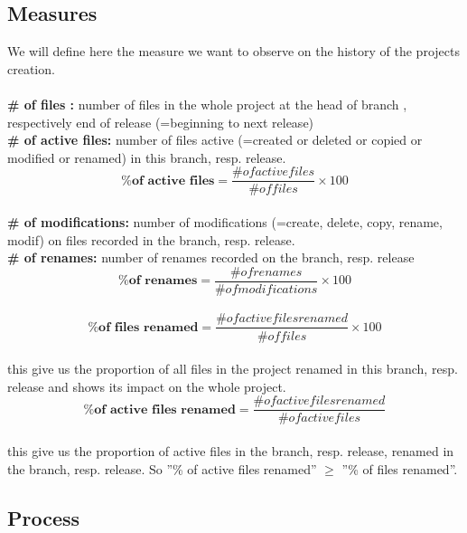 \subsection{Measures}
We will define here the measure we want to observe on the history of the projects creation.\\\\	
\textbf{\# of files :} number of files in the whole project at the head of branch , respectively end of release (=beginning to next release)\\
\textbf{\# of active files:} number of files active (=created or deleted or copied or modified or renamed) in this branch, resp. release.\\
\[ \textbf{\% of active files} = \frac{\# of active files}{\# of files} \times 100 \] \\
\textbf{\# of modifications:}  number of modifications (=create, delete, copy, rename, modif) on files recorded in the branch, resp. release.\\
\textbf{\# of renames:} number of renames recorded on the branch, resp. release\\
\[ \textbf{\% of renames} = \frac{\# of renames}{\# of modifications} \times 100 \] \\
\[ \textbf{\% of files renamed} = \frac{\# of active files renamed}{\# of files} \times 100 \] \\
this give us the proportion of all files in the project renamed in this branch, resp. release and shows its impact on the whole project.\\
\[ \textbf{\% of active files renamed} = \frac{\# of active files renamed}{\# of active files} \] \\
this give us the proportion of active files in the branch, resp. release, renamed in the branch, resp. release. So ''\% of active files renamed'' $\geq$ ''\% of files renamed''. \\
\label{subsec:Measures}

\subsection{Process}

